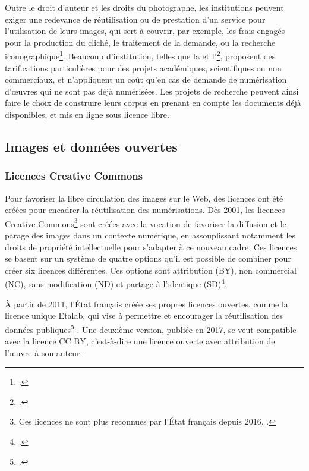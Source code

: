 Outre le droit d'auteur et les droits du photographe, les institutions peuvent exiger une redevance de réutilisation ou de prestation d'un service pour l'utilisation de leurs images, qui sert à couvrir, par exemple, les frais engagés pour la production du cliché, le traitement de la demande, ou la recherche iconographique\footcite{GuidePratiquePour}. Beaucoup d'institution, telles que la \bnf et l'\inha\footcite{denoyelleProposCoutImages2021}, proposent des tarifications particulières pour des projets académiques, scientifiques ou non commerciaux, et n'appliquent un coût qu'en cas de demande de numérisation d'œuvres qui ne sont pas déjà numérisées. Les projets de recherche peuvent ainsi faire le choix de construire leurs corpus en prenant en compte les documents déjà disponibles, et mis en ligne sous licence libre.

    \subsection{Images et données ouvertes}
        \subsubsection{Licences Creative Commons}
Pour favoriser la libre circulation des images sur le Web, des licences ont été créées pour encadrer la réutilisation des numérisations. Dès 2001, les licences Creative Commons\footnote{Ces licences ne sont plus reconnues par l'État français depuis 2016. \cite{denoyelleSavoirLicenceEtalab2021}.} sont créées avec la vocation de favoriser la diffusion et le parage des images dans un contexte numérique, en assouplissant notamment les droits de propriété intellectuelle pour s'adapter à ce nouveau cadre. Ces licences se basent sur un système de quatre options qu'il est possible de combiner pour créer six licences différentes. Ces options sont attribution (BY), non commercial (NC), sans modification (ND) et partage à l’identique (SD)\footcite{GuidePratiquePour}. 

À partir de 2011, l'État français créée ses propres licences ouvertes, comme la licence unique Etalab, qui vise à \og permettre et encourager la réutilisation des données publiques\footcite{denoyelleSavoirLicenceEtalab2021} \fg. Une deuxième version, publiée en 2017, se veut compatible avec la licence CC BY, c'est-à-dire une licence ouverte avec attribution de l'œuvre à son auteur.

